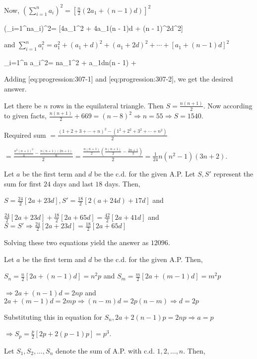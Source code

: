   Now, $\left(\sum_{i=1}^na_i\right)^2 = \left[\frac{n}{2}(2a_1 + (n - 1)d)\right]^2$

  \placeformula[eq:progression:307-1]\startformula \left(\sum_{i=1}^na_i\right)^2= [4a_1^2 + 4a_1(n -
    1)d + (n - 1)^2d^2]\stopformula

  and $\sum_{i=1}^n a_i^2 = a_1^2 + (a_1 + d)^2 + (a_1 + 2d)^2 + \cdots + [a_1 + (n - 1)d]^2$

  \placeformula[eq:progression:307-2]\startformula\sum_{i=1}^n a_i^2= na_1^2 + a_1dn(n - 1) + \stopformula

  Adding [eq:progression:307-1] and [eq:progression:307-2], we get the desired answer.
\item Let there be $n$ rows in the equilateral triangle. Then $S = \frac{n(n + 1)}{2}$. Now according to
  given facts, $\frac{n(n + 1)}{2} + 669 = (n - 8)^2 \Rightarrow n = 55 \Rightarrow S = 1540$.
\item Required sum $= \frac{(1 + 2 + 3 + \cdots + n)^2 - (1^2 + 2^2 + 3^2 + \cdots + n^2)}{2}$

  $= \frac{\tfrac{n^2(n + 1)^2}{4} - \tfrac{n(n + 1)(2n + 1)}{6}}{2} = \frac{\tfrac{n(n +
    1)}{2}\left(\tfrac{n(n + 1)}{2} - \tfrac{2n + 1}{3}\right)}{2} = \tfrac{1}{24}n(n^2 - 1)(3n + 2)$.
\item Let $a$ be the first term and $d$ be the c.d. for the given A.P. Let $S, S'$ represent the sum for
  first $24$ days and last $18$ days. Then,

  $S = \frac{24}{2}[2a + 23d], S' = \frac{18}{2}[2(a + 24d) + 17d]$ and

  $\frac{24}{2}[2a + 23d] + \frac{18}{2}[2a + 65d] = \frac{42}{2}[2a + 41d]$ and $S = S' \Rightarrow
  \frac{24}{2}[2a + 23d] = \frac{18}{2}[2a + 65d]$

  Solving these two equations yield the answer as $12096$.
\item Let $a$ be the first term and $d$ be the c.d. for the given A.P. Then,

  $S_n = \frac{n}{2}[2a + (n - 1)d] = n^2p$ and $S_m = \frac{m}{2}[2a + (m - 1)d] = m^2p$

  $\Rightarrow 2a + (n - 1)d = 2np$ and $2a + (m - 1)d = 2mp \Rightarrow (n - m)d = 2p(n - m) \Rightarrow d
  = 2p$

  Substituting this in equation for $S_n, 2a + 2(n - 1)p = 2np \Rightarrow a = p$

  $\Rightarrow S_p = \frac{p}{2}[2p + 2(p - 1)p] = p^3$.
\item Let $S_1, S_2, \ldots, S_n$ denote the sum of A.P. with c.d. $1, 2, \ldots, n$. Then,

